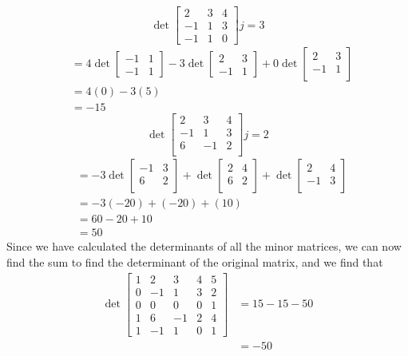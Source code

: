 \documentclass{report}
\begin{document}
$$
\operatorname{det}
\begin{bmatrix}
2&3&4\\
-1&1&3\\
-1&1&0 
\end{bmatrix} j = 3
$$
$$
\begin{aligned}
& = 4\operatorname{det}
\begin{bmatrix}
-1&1\\
-1&1 
\end{bmatrix} -3
\operatorname{det}
\begin{bmatrix}
2&3\\
-1&1
\end{bmatrix} +
0\operatorname{det}
\begin{bmatrix}
2&3\\
-1&1\\
\end{bmatrix} \\
& = 4(0) - 3(5) \\
& = -15
\end{aligned}
$$
$$
\operatorname{det}
\begin{bmatrix}
2&3&4\\
-1&1&3\\
6&-1&2\\
\end{bmatrix} j=2
$$
$$
\begin{aligned}
& = -3\operatorname{det}
\begin{bmatrix}
-1&3\\
6&2\\
\end{bmatrix} +
\operatorname{det}
\begin{bmatrix}
2&4\\
6&2\\
\end{bmatrix} +
\operatorname{det}
\begin{bmatrix}
2&4\\
-1&3\\
\end{bmatrix} \\
& = -3(-20) + (-20) + (10) \\
& = 60 - 20 + 10 \\
& = 50
\end{aligned}
$$
Since we have calculated the determinants of all the minor matrices,  we can now find the sum to find the determinant of the original matrix,  and we find that
$$
\begin{aligned}
\operatorname{det}
\begin{bmatrix}
1&2&3&4&5\\
0&-1&1&3&2\\
0&0&0&0&1\\
1&6&-1&2&4\\
1&-1&1&0&1 
\end{bmatrix} & =
15 - 15 - 50 \\
& = -50
\end{aligned}
$$
\end{document}
